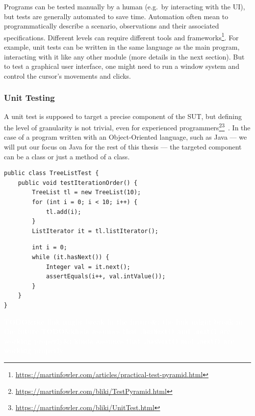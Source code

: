 \documentclass[11pt]{sdm_internship}
\newcommand{\todo}[1]{\colorbox{Red!75}{\textcolor{white}{\textbf{TODO\ifx&#1&\else: #1\fi}}}}
\theoremstyle{definition}
\begin{document}
Programs can be tested manually by a human (e.g.\ by interacting with the UI), but tests are generally automated to save time.
Automation often mean to programmatically describe a scenario, observations and their associated specifications.
Different levels can require different tools and frameworks\footnote{\url{https://martinfowler.com/articles/practical-test-pyramid.html}}.
For example, unit tests can be written in the same language as the main program, interacting with it like any other module (more details in the next section).
But to test a graphical user interface, one might need to run a window system and control the cursor's movements and clicks.

\subsubsection{Unit Testing}%
\label{sssec:unit_testing}

A unit test is supposed to target a precise component of the SUT, but defining the level of granularity is not trivial, even for experienced programmers\footnote{\url{https://martinfowler.com/bliki/TestPyramid.html}}\footnote{\url{https://martinfowler.com/bliki/UnitTest.html}}~\cite{runeson2006survey}.
In the case of a program written with an Object-Oriented language, such as Java --- we will put our focus on Java for the rest of this thesis --- the targeted component can be a class or just a method of a class.

\begin{listing}[H]
  \centering
  \begin{verbatim}
public class TreeListTest {
    public void testIterationOrder() {
        TreeList tl = new TreeList(10);
        for (int i = 0; i < 10; i++) {
            tl.add(i);
        }
        ListIterator it = tl.listIterator();
  \end{verbatim}
  \begin{verbatim}
        int i = 0;
        while (it.hasNext()) {
            Integer val = it.next();
            assertEquals(i++, val.intValue());
        }
    }
}
  \end{verbatim}
  \caption{Example of an object-oriented unit test (taken, and adapted for readability, from the Apache Commons Collections, in the class TreeListTest, line 270\protect\footnotemark): it consists of test inputs (lines 3--7) that manipulate the SUT\@; and assertions (line 11).\todo{what about lines 9 \& 10}}%
\label{lst:test_example}
\end{listing}
\todo{the link might break in the future}
\todo{kinda assumes that \texttt{.hasNext()} and \texttt{.next()} are working properly}
\end{document}
